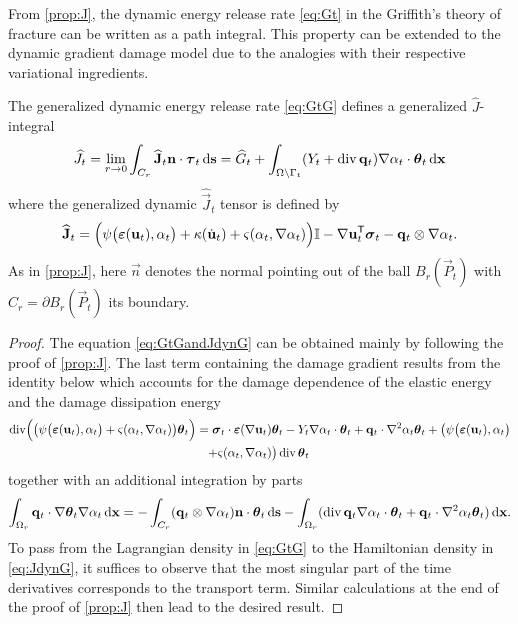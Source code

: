 From \cref{prop:J}, the dynamic energy release rate \eqref{eq:Gt} in the Griffith's theory of fracture can be written as a path integral. This property can be extended to the dynamic gradient damage model due to the analogies with their respective variational ingredients.
\begin{proposition} \label{prop:EshelbyG}
The generalized dynamic energy release rate \eqref{eq:GtG} defines a generalized $\widehat{J}$-integral
\begin{equation} \label{eq:GtGandJdynG}
\widehat{J}_t=\lim_{r\to 0}\int_{C_r}\widehat{\vec{J}}_t\vec{n}\cdot\vtau_t\ds=\widehat{G}_t+\int_\domaint (Y_t+\div\vec{q}_t)\nabla\alpha_t\cdot\vtheta_t\dx
\end{equation}
where the generalized dynamic $\widehat{\vec{J}}_t$ tensor is defined by
\begin{equation} \label{eq:JdynG}
\widehat{\vec{J}}_t=\Bigl(\psi\bigl(\eps(\vec{u}_t),\alpha_t\bigr)+\kappa(\dot{\vec{u}}_t)+\varsigma(\alpha_t,\nabla\alpha_t)\Bigr)\mathbb{I}-\nabla\vec{u}_t^\mT\sig_t-\vec{q}_t\otimes\nabla\alpha_t.
\end{equation}
As in \cref{prop:J}, here $\vec{n}$ denotes the normal pointing out of the ball $B_r(\vec{P}_t)$ with $C_r=\partial B_r(\vec{P}_t)$ its boundary.
\end{proposition}

\begin{proof}
The equation \eqref{eq:GtGandJdynG} can be obtained mainly by following the proof of \cref{prop:J}. The last term containing the damage gradient results from the identity below which accounts for the damage dependence of the elastic energy and the damage dissipation energy
\begin{multline} \label{eq:includedamage}
\div\Bigl(\bigl(\psi\bigl(\eps(\vec{u}_t),\alpha_t\bigr)+\varsigma(\alpha_t,\nabla\alpha_t)\bigr)\vtheta_t\Bigr)=\sig_t\cdot\eps(\nabla\vec{u}_t)\vtheta_t-Y_t\nabla\alpha_t\cdot\vtheta_t+\vec{q}_t\cdot\nabla^2\alpha_t\vtheta_t+\bigl(\psi\bigl(\eps(\vec{u}_t),\alpha_t\bigr) \\
+\varsigma(\alpha_t,\nabla\alpha_t)\bigr)\div\vtheta_t\,
\end{multline}
together with an additional integration by parts
\[
\int_{\Omega_r}\vec{q}_t\cdot\nabla\vtheta_t\nabla\alpha_t\dx=-\int_{C_r}(\vec{q}_t\otimes\nabla\alpha_t)\vec{n}\cdot\vtheta_t\ds-\int_{\Omega_r}(\div\vec{q}_t\nabla\alpha_t\cdot\vtheta_t+\vec{q}_t\cdot\nabla^2\alpha_t\vtheta_t)\dx.
\]
To pass from the Lagrangian density in \eqref{eq:GtG} to the Hamiltonian density in \eqref{eq:JdynG}, it suffices to observe that the most singular part of the time derivatives corresponds to the transport term. Similar calculations at the end of the proof of \cref{prop:J} then lead to the desired result.
\end{proof}

